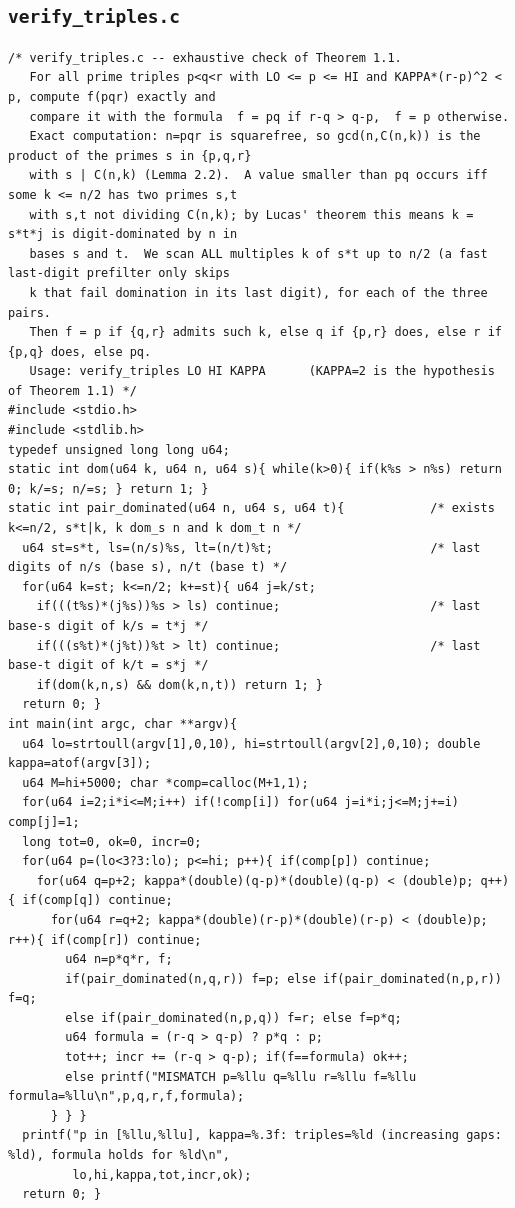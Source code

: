 \documentclass[11pt,a4paper]{article}
\theoremstyle{definition}
\begin{document}
\subsection{\texttt{verify\_triples.c}}
\begin{lstlisting}
/* verify_triples.c -- exhaustive check of Theorem 1.1.
   For all prime triples p<q<r with LO <= p <= HI and KAPPA*(r-p)^2 < p, compute f(pqr) exactly and
   compare it with the formula  f = pq if r-q > q-p,  f = p otherwise.
   Exact computation: n=pqr is squarefree, so gcd(n,C(n,k)) is the product of the primes s in {p,q,r}
   with s | C(n,k) (Lemma 2.2).  A value smaller than pq occurs iff some k <= n/2 has two primes s,t
   with s,t not dividing C(n,k); by Lucas' theorem this means k = s*t*j is digit-dominated by n in
   bases s and t.  We scan ALL multiples k of s*t up to n/2 (a fast last-digit prefilter only skips
   k that fail domination in its last digit), for each of the three pairs.
   Then f = p if {q,r} admits such k, else q if {p,r} does, else r if {p,q} does, else pq.
   Usage: verify_triples LO HI KAPPA      (KAPPA=2 is the hypothesis of Theorem 1.1) */
#include <stdio.h>
#include <stdlib.h>
typedef unsigned long long u64;
static int dom(u64 k, u64 n, u64 s){ while(k>0){ if(k%s > n%s) return 0; k/=s; n/=s; } return 1; }
static int pair_dominated(u64 n, u64 s, u64 t){            /* exists k<=n/2, s*t|k, k dom_s n and k dom_t n */
  u64 st=s*t, ls=(n/s)%s, lt=(n/t)%t;                      /* last digits of n/s (base s), n/t (base t) */
  for(u64 k=st; k<=n/2; k+=st){ u64 j=k/st;
    if(((t%s)*(j%s))%s > ls) continue;                     /* last base-s digit of k/s = t*j */
    if(((s%t)*(j%t))%t > lt) continue;                     /* last base-t digit of k/t = s*j */
    if(dom(k,n,s) && dom(k,n,t)) return 1; }
  return 0; }
int main(int argc, char **argv){
  u64 lo=strtoull(argv[1],0,10), hi=strtoull(argv[2],0,10); double kappa=atof(argv[3]);
  u64 M=hi+5000; char *comp=calloc(M+1,1);
  for(u64 i=2;i*i<=M;i++) if(!comp[i]) for(u64 j=i*i;j<=M;j+=i) comp[j]=1;
  long tot=0, ok=0, incr=0;
  for(u64 p=(lo<3?3:lo); p<=hi; p++){ if(comp[p]) continue;
    for(u64 q=p+2; kappa*(double)(q-p)*(double)(q-p) < (double)p; q++){ if(comp[q]) continue;
      for(u64 r=q+2; kappa*(double)(r-p)*(double)(r-p) < (double)p; r++){ if(comp[r]) continue;
        u64 n=p*q*r, f;
        if(pair_dominated(n,q,r)) f=p; else if(pair_dominated(n,p,r)) f=q;
        else if(pair_dominated(n,p,q)) f=r; else f=p*q;
        u64 formula = (r-q > q-p) ? p*q : p;
        tot++; incr += (r-q > q-p); if(f==formula) ok++;
        else printf("MISMATCH p=%llu q=%llu r=%llu f=%llu formula=%llu\n",p,q,r,f,formula);
      } } }
  printf("p in [%llu,%llu], kappa=%.3f: triples=%ld (increasing gaps: %ld), formula holds for %ld\n",
         lo,hi,kappa,tot,incr,ok);
  return 0; }
\end{lstlisting}
\end{document}
